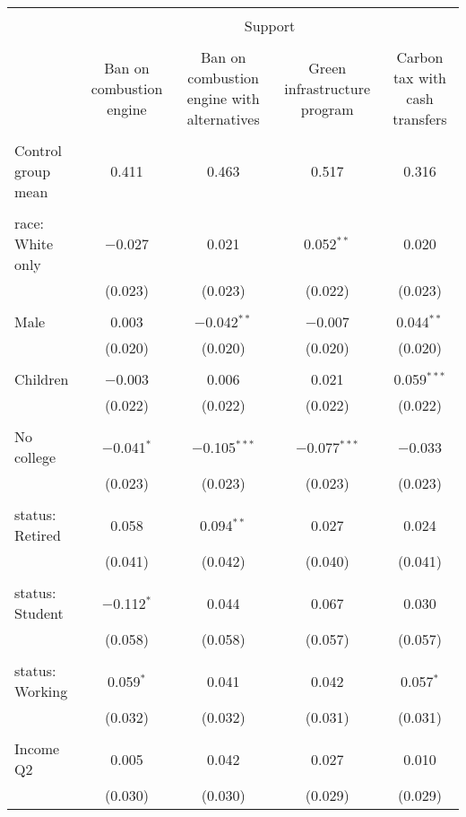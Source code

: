 
\begin{tabular}{@{\extracolsep{5pt}}lcccc} 
\\[-1.8ex]\hline 
\hline \\[-1.8ex] 
 & \multicolumn{4}{c}{Support} \\ 
\cline{2-5} 
\\[-1.8ex] & Ban on combustion engine & Ban on combustion engine with alternatives & Green infrastructure program & Carbon tax with cash transfers \\ 
\hline \\[-1.8ex] 
 Control group mean & 0.411 & 0.463 & 0.517 & 0.316  \\ \hline \\[-1.8ex] race: White only & $-$0.027 & 0.021 & 0.052$^{**}$ & 0.020 \\ 
  & (0.023) & (0.023) & (0.022) & (0.023) \\ 
  & & & & \\ 
 Male & 0.003 & $-$0.042$^{**}$ & $-$0.007 & 0.044$^{**}$ \\ 
  & (0.020) & (0.020) & (0.020) & (0.020) \\ 
  & & & & \\ 
 Children & $-$0.003 & 0.006 & 0.021 & 0.059$^{***}$ \\ 
  & (0.022) & (0.022) & (0.022) & (0.022) \\ 
  & & & & \\ 
 No college & $-$0.041$^{*}$ & $-$0.105$^{***}$ & $-$0.077$^{***}$ & $-$0.033 \\ 
  & (0.023) & (0.023) & (0.023) & (0.023) \\ 
  & & & & \\ 
 status: Retired & 0.058 & 0.094$^{**}$ & 0.027 & 0.024 \\ 
  & (0.041) & (0.042) & (0.040) & (0.041) \\ 
  & & & & \\ 
 status: Student & $-$0.112$^{*}$ & 0.044 & 0.067 & 0.030 \\ 
  & (0.058) & (0.058) & (0.057) & (0.057) \\ 
  & & & & \\ 
 status: Working & 0.059$^{*}$ & 0.041 & 0.042 & 0.057$^{*}$ \\ 
  & (0.032) & (0.032) & (0.031) & (0.031) \\ 
  & & & & \\ 
 Income Q2 & 0.005 & 0.042 & 0.027 & 0.010 \\ 
  & (0.030) & (0.030) & (0.029) & (0.029) \\ 

\end{tabular}
